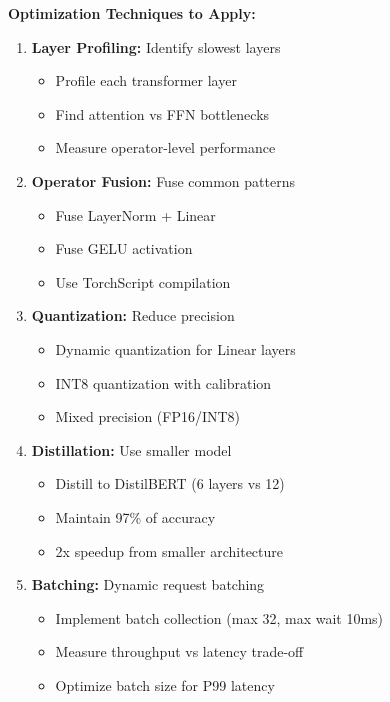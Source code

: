 \textbf{Optimization Techniques to Apply:}
\begin{enumerate}
    \item \textbf{Layer Profiling:} Identify slowest layers
        \begin{itemize}
            \item Profile each transformer layer
            \item Find attention vs FFN bottlenecks
            \item Measure operator-level performance
        \end{itemize}

    \item \textbf{Operator Fusion:} Fuse common patterns
        \begin{itemize}
            \item Fuse LayerNorm + Linear
            \item Fuse GELU activation
            \item Use TorchScript compilation
        \end{itemize}

    \item \textbf{Quantization:} Reduce precision
        \begin{itemize}
            \item Dynamic quantization for Linear layers
            \item INT8 quantization with calibration
            \item Mixed precision (FP16/INT8)
        \end{itemize}

    \item \textbf{Distillation:} Use smaller model
        \begin{itemize}
            \item Distill to DistilBERT (6 layers vs 12)
            \item Maintain 97\% of accuracy
            \item 2x speedup from smaller architecture
        \end{itemize}

    \item \textbf{Batching:} Dynamic request batching
        \begin{itemize}
            \item Implement batch collection (max 32, max wait 10ms)
            \item Measure throughput vs latency trade-off
            \item Optimize batch size for P99 latency
        \end{itemize}
\end{enumerate}

